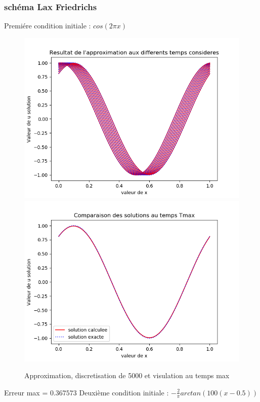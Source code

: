 \documentclass[12pt]{article}
\begin{document}
\subsubsection{schéma Lax Friedrichs}
Premiére condition initiale : $cos(2 \pi x)$
 \begin{figure}[H]
	\centering
	\includegraphics[scale=0.40]{1D_c1_5000_s5_i1.png}
	\includegraphics[scale=0.40]{1D_c1_5000_s5_init1.png}
	\caption{Approximation, discretisation de 5000 et visulation au temps max}
	\label{1D}
	\end{figure}
Erreur max = $0.367573$
Deuxième condition initiale : $-\frac{2}{\pi}arctan(100(x-0.5))$
\end{document}
